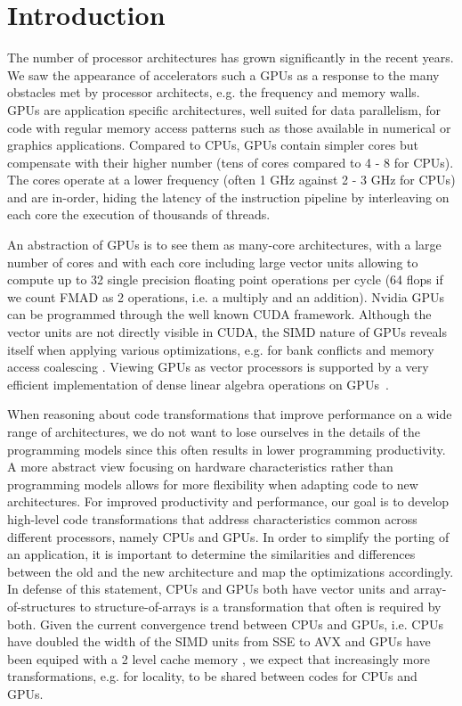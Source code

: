 \section{Introduction}
The number of processor architectures has grown significantly in the recent
years. We saw the appearance of accelerators such a GPUs as a response to the
many obstacles met by processor architects, e.g. the frequency and memory walls.
GPUs are application specific architectures, well suited for data parallelism,
for code with regular memory access patterns such as those available in
numerical or graphics applications. Compared to CPUs, GPUs contain simpler cores
but compensate with their higher number (tens of cores compared to 4 - 8 for
CPUs). The cores operate at a lower frequency (often 1 GHz against 2 - 3 GHz for
CPUs) and are in-order, hiding the latency of the instruction pipeline by
interleaving on each core the execution of thousands of threads.

An abstraction of GPUs is to see them as many-core architectures, with a large
number of cores and with each core including large vector units allowing to
compute up to 32 single precision floating point operations per cycle (64 flops
if we count FMAD as 2 operations, i.e. a multiply and an addition). Nvidia GPUs
can be programmed through the well known CUDA framework. Although the vector
units are not directly visible in CUDA, the SIMD nature of GPUs reveals itself
when applying various optimizations, e.g. for bank conflicts and memory access
coalescing \cite{cuda}. Viewing GPUs as vector processors is supported by a very
efficient implementation of dense linear algebra operations on
GPUs~\cite{Volkov:2008:BGT:1413370.1413402}.

When reasoning about code transformations that improve performance on a wide
range of architectures, we do not want to lose ourselves in the details of the
programming models since this often results in lower programming productivity.
A more abstract view focusing on hardware characteristics rather than
programming models allows for more flexibility when adapting code to new
architectures. For improved productivity and performance, our goal is to develop
high-level code transformations that address characteristics common across
different processors, namely CPUs and GPUs. In order to simplify the porting of
an application, it is important to determine the similarities and differences
between the old and the new architecture and map the optimizations accordingly.
In defense of this statement, CPUs and GPUs both have vector units and
array-of-structures to structure-of-arrays is a transformation that often is
required by both. Given the current convergence trend between CPUs and GPUs,
i.e. CPUs have doubled the width of the SIMD units from SSE to AVX and GPUs have
been equiped with a 2 level cache memory \cite{fermi}, we expect that
increasingly more transformations, e.g. for locality, to be shared between codes
for CPUs and GPUs.

